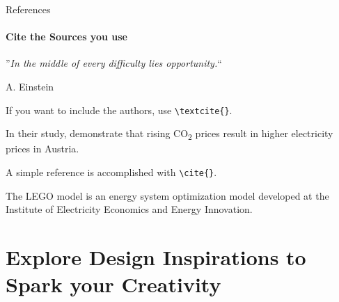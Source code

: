 \documentclass[aspectratio=169]{beamer}
\begin{document}
\begin{frame}
\end{frame}


\begin{frame}{References}
    \framesubtitle{Cite the Sources you use}

  \begin{coloredblock}[grey]
    \centering
      ”\textit{In the middle of every difficulty lies opportunity.}“
      
      \vspace{0.7cm}
      \scriptsize A. Einstein \cite{einstein2018}
  \end{coloredblock}

  \vspace{0.1cm}

  \begin{coloredblock}
      If you want to include the authors, use \texttt{\textbackslash textcite\{\}}.

      \vspace{0.5cm}
      In their study, \textbf{\textcite{gaugl2023}} demonstrate that rising CO\textsubscript{2} prices result in higher electricity prices in Austria.
  \end{coloredblock}

  \vspace{0.1cm}

  \begin{coloredblock}
      A simple reference is accomplished with \texttt{\textbackslash cite\{\}}.

      \vspace{0.5cm}
      The LEGO model is an energy system optimization model developed at the Institute of Electricity Economics and Energy Innovation. \textbf{\cite{wogrin2022}}
  \end{coloredblock}

\end{frame}


\section{Explore \textbf{Design Inspirations} to Spark  your Creativity}
\end{document}
